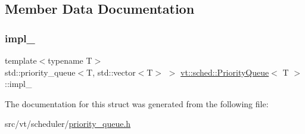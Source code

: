 \subsection{Member Data Documentation}
\mbox{\label{structvt_1_1sched_1_1_priority_queue_a7b4a0abb373f4810e869bfc11303f487}} 
\subsubsection{\texorpdfstring{impl\+\_\+}{impl\_}}
{\footnotesize\ttfamily template$<$typename T$>$ \\
std\+::priority\+\_\+queue$<$T, std\+::vector$<$T$>$ $>$ \hyperlink{structvt_1_1sched_1_1_priority_queue}{vt\+::sched\+::\+Priority\+Queue}$<$ T $>$\+::impl\+\_\+\hspace{0.3cm}{\ttfamily [private]}}



The documentation for this struct was generated from the following file\+:\begin{DoxyCompactItemize}
\item 
src/vt/scheduler/\hyperlink{priority__queue_8h}{priority\+\_\+queue.\+h}\end{DoxyCompactItemize}
